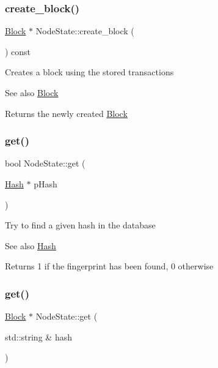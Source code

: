 \subsubsection{\texorpdfstring{create\+\_\+block()}{create\_block()}}
{\footnotesize\ttfamily \mbox{\hyperlink{classBlock}{Block}} $\ast$ Node\+State\+::create\+\_\+block (\begin{DoxyParamCaption}{ }\end{DoxyParamCaption}) const}

Creates a block using the stored transactions \begin{DoxySeeAlso}{See also}
\mbox{\hyperlink{classBlock}{Block}}
\end{DoxySeeAlso}
\begin{DoxyReturn}{Returns}
the newly created \mbox{\hyperlink{classBlock}{Block}} 
\end{DoxyReturn}
\mbox{\label{classNodeState_a771321e4b2c56515ffb79e57da71db30}} 
\subsubsection{\texorpdfstring{get()}{get()}\hspace{0.1cm}{\footnotesize\ttfamily [1/2]}}
{\footnotesize\ttfamily bool Node\+State\+::get (\begin{DoxyParamCaption}\item[{\mbox{\hyperlink{classHash}{Hash}} $\ast$}]{p\+Hash }\end{DoxyParamCaption})}

Try to find a given hash in the database \begin{DoxySeeAlso}{See also}
\mbox{\hyperlink{classHash}{Hash}}
\end{DoxySeeAlso}
\begin{DoxyReturn}{Returns}
1 if the fingerprint has been found, 0 otherwise 
\end{DoxyReturn}
\mbox{\label{classNodeState_a130cf13803990afc44bee6bed8dd4e05}} 
\subsubsection{\texorpdfstring{get()}{get()}\hspace{0.1cm}{\footnotesize\ttfamily [2/2]}}
{\footnotesize\ttfamily \mbox{\hyperlink{classBlock}{Block}} $\ast$ Node\+State\+::get (\begin{DoxyParamCaption}\item[{std\+::string \&}]{hash }\end{DoxyParamCaption})}

